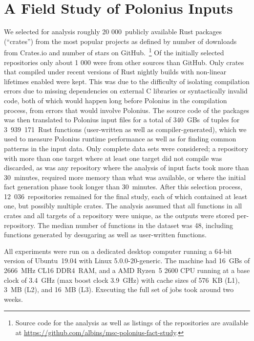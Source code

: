 \documentclass[11pt,a4paper,twoside,openany,draft]{report}
\begin{document}
\chapter{A Field Study of Polonius Inputs}\label{sec:field-study-borrow}

We selected for analysis roughly 20 000~publicly available Rust packages
(``crates'') from the most popular projects as defined by number of downloads
from Crates.io and number of stars on GitHub.~\footnote{Source code for the
  analysis as well as listings of the repositories are available at
  \url{https://github.com/albins/msc-polonius-fact-study}.} Of the initially
selected repositories only about 1 000 were from other sources than GitHub. Only
crates that compiled under recent versions of Rust nightly builds with
non-linear lifetimes enabled were kept. This was due to the difficulty of
isolating compilation errors due to missing dependencies on external C libraries
or syntactically invalid code, both of which would happen long before Polonius
in the compilation process, from errors that would involve Polonius. The source
code of the packages was then translated to Polonius input files for a total of
340~GBs~of tuples for 3~939~171~Rust functions (user-written as well as
compiler-generated), which we used to measure Polonius runtime performance as
well as for finding common patterns in the input data. Only complete data sets
were considered; a repository with more than one target where at least one
target did not compile was discarded, as was any repository where the analysis
of input facts took more than 30~minutes, required more memory than what was
available, or where the initial fact generation phase took longer than
30~minutes. After this selection process, 12~036~repositories remained for the
final study, each of which contained at least one, but possibly multiple crates.
The analysis assumed that all functions in all crates and all targets of a
repository were unique, as the outputs were stored per-repository. The median
number of functions in the dataset was 48, including functions generated by
desugaring as well as user-written functions.

All experiments were run on a dedicated desktop computer running a 64-bit
version of Ubuntu~19.04 with Linux 5.0.0-20-generic. The machine had 16~GBs of
2666~MHz CL16 DDR4~RAM, and a AMD Ryzen~5 2600 CPU running at a base clock of
3.4~GHz (max boost clock 3.9~GHz) with cache sizes of 576~KB (L1), 3~MB (L2),
and 16~MB (L3). Executing the full set of jobs took around two weeks.
\end{document}
